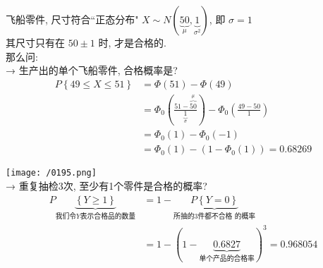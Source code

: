 \documentclass[UTF8]{ctexart}
\begin{document}
\begin{myEnvSample}
飞船零件, 尺寸符合``正态分布" $X\sim N\left( \underset{\mu}{\underbrace{50}},\underset{\sigma ^2}{\underbrace{1}} \right) $, 即 $\sigma=1$ \\
其尺寸只有在 $50 \pm 1$ 时, 才是合格的. \\

那么问:  \\
→ 生产出的单个飞船零件, 合格概率是? 
\begin{align*}  %
	P\left\{ 49\leq X\leq 51 \right\} 
&=\varPhi \left( 51 \right) -\varPhi \left( 49 \right)\\
&=\varPhi _0\left( \frac{51-\overset{\mu}{\overbrace{50}}}{\underset{\sigma}{\underbrace{1}}} \right) -\varPhi _0\left( \frac{49-50}{1} \right)\\
&=\varPhi _0\left( 1 \right) -\varPhi _0\left( -1 \right)\\
&=\varPhi _0\left( 1 \right) -\left( 1-\varPhi _0\left( 1 \right) \right) =0.68269 
\end{align*}

\texttt{[image: /0195.png]} \\



→ 重复抽检3次, 至少有1个零件是合格的概率?
\begin{align*}  %
	P\underset{\text{我们令}Y\text{表示合格品的数量}}{\underbrace{\left\{ Y\ge 1 \right\} }}
	&=1-\underset{\text{所抽的3件都不合格\ 的概率}}{\underbrace{P\left\{ Y=0 \right\} }}\\
&=1-\left( 1-\underset{\text{单个产品的合格率}}{\underbrace{0.6827}} \right) ^3=0.968054
\end{align*}
\end{myEnvSample}
\vspace{1em} 
\end{document}
